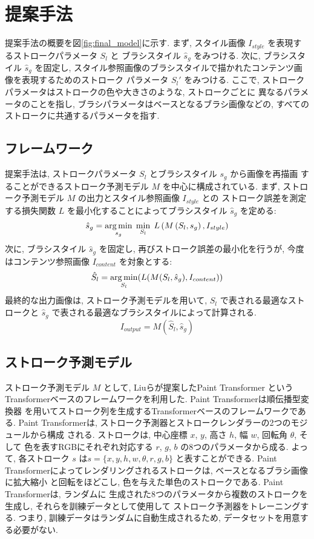 \documentclass[MIRU,submit,uplatex]{miru2023j}
\begin{document}
\section{提案手法}
提案手法の概要を図\ref{fig:final_model}に示す. 
まず, スタイル画像 $I_{style}$ を表現するストロークパラメータ $S_l$ と
ブラシスタイル $\hat{s}_g$ をみつける. 次に, ブラシスタイル $\hat{s}_g$ を固定し, 
スタイル参照画像のブラシスタイルで描かれたコンテンツ画像を表現するためのストローク
パラメータ $S_l'$ をみつける. 
ここで, ストロークパラメータはストロークの色や大きさのような, ストロークごとに
異なるパラメータのことを指し, ブラシパラメータはベースとなるブラシ画像などの, 
すべてのストロークに共通するパラメータを指す. 

\subsection{フレームワーク}
提案手法は, ストロークパラメータ $S_l$ とブラシスタイル $s_g$ から画像を再描画
することができるストローク予測モデル $M$ を中心に構成されている. 
まず, ストローク予測モデル $M$ の出力とスタイル参照画像 $I_{style}$ との
ストローク誤差を測定する損失関数 $L$ を最小化することによってブラシスタイル
$\hat{s}_g$ を定める: 
\begin{equation}
    \hat{s}_g = \operatorname*{arg\,min}_{s_g} \;
        \min_{S_l} \;
           L\left( M\left(S_l, s_g\right), I_{style}\right)
    \label{eq_first}
\end{equation}
次に, ブラシスタイル $\hat{s}_g$ を固定し, 再びストローク誤差の最小化を行うが,
今度はコンテンツ参照画像 $I_{content}$ を対象とする: 
\begin{equation}
    \hat{S}_l = \operatorname*{arg\,min}_{S_l} (L(M(S_l, \hat{s}_g), I_{content}))
    \label{eq_second}
\end{equation}
最終的な出力画像は, ストローク予測モデルを用いて, $S_l$ で表される最適なストロークと
$\hat{s}_g$ で表される最適なブラシスタイルによって計算される.
\begin{equation}
    I_{output} = M( \hat{S}_l, \hat{s}_g )
\end{equation}
 
\subsection{ストローク予測モデル}
ストローク予測モデル $M$ として, Liuら\cite{PaintTransformer}が提案したPaint Transformer
というTransformerベースのフレームワークを利用した. Paint Transformerは順伝播型変換器
を用いてストローク列を生成するTransformerベースのフレームワークである.
Paint Transformerは, ストローク予測器とストロークレンダラーの2つのモジュールから構成
される. ストロークは, 中心座標 $x$, $y$, 高さ $h$, 幅 $w$, 回転角 $\theta$, そして
色を表すRGBにそれぞれ対応する $r$, $g$, $b$ の8つのパラメータから成る. 
よって, 各ストローク $s$ は$s = \{ x, y, h, w, \theta, r, g, b \}$ と表すことができる.
Paint Transformerによってレンダリングされるストロークは, ベースとなるブラシ画像に拡大縮小
と回転をほどこし, 色を与えた単色のストロークである. Paint Transformerは, ランダムに
生成された8つのパラメータから複数のストロークを生成し, それらを訓練データとして使用して
ストローク予測器をトレーニングする. つまり, 訓練データはランダムに自動生成されるため,
データセットを用意する必要がない.
\end{document}
